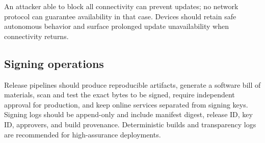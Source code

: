 An attacker able to block all connectivity can prevent updates; no network
protocol can guarantee availability in that case. Devices should retain safe
autonomous behavior and surface prolonged update unavailability when connectivity
returns.

\subsection{Signing operations}

Release pipelines should produce reproducible artifacts, generate a software bill
of materials, scan and test the exact bytes to be signed, require independent
approval for production, and keep online services separated from signing keys.
Signing logs should be append-only and include manifest digest, release ID, key
ID, approvers, and build provenance. Deterministic builds and transparency logs
are recommended for high-assurance deployments.

